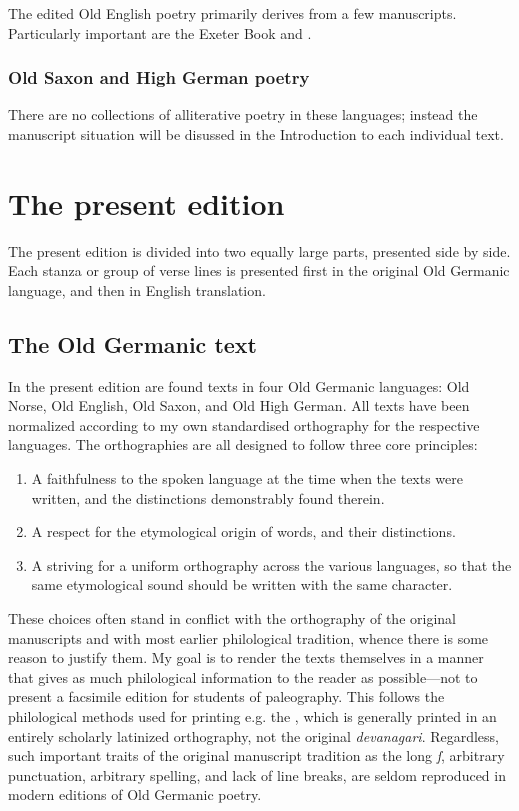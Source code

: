     The edited Old English poetry primarily derives from a few manuscripts.  Particularly important are the Exeter Book and \Lacnunga.

    \subsubsection{Old Saxon and High German poetry}

    There are no collections of alliterative poetry in these languages; instead the manuscript situation will be disussed in the Introduction to each individual text.


\section{The present edition}

  The present edition is divided into two equally large parts, presented side by side.  Each stanza or group of verse lines is presented first in the original Old Germanic language, and then in English translation.

  \subsection{The Old Germanic text}

    In the present edition are found texts in four Old Germanic languages: Old Norse, Old English, Old Saxon, and Old High German.  All texts have been normalized according to my own standardised orthography for the respective languages. The orthographies are all designed to follow three core principles:

    \begin{enumerate}
      \item A faithfulness to the spoken language at the time when the texts were written, and the distinctions demonstrably found therein.
      \item A respect for the etymological origin of words, and their distinctions.
      \item A striving for a uniform orthography across the various languages, so that the same etymological sound should be written with the same character.
    \end{enumerate}

    These choices often stand in conflict with the orthography of the original manuscripts and with most earlier philological tradition, whence there is some reason to justify them.  My goal is to render the texts themselves in a manner that gives as much philological information to the reader as possible—not to present a facsimile edition for students of paleography.  This follows the philological methods used for printing e.g. the \Rigveda, which is generally printed in an entirely scholarly latinized orthography, not the original \emph{devanagari}.  Regardless, such important traits of the original manuscript tradition as the long \emph{ſ}, arbitrary punctuation, arbitrary spelling, and lack of line breaks, are seldom reproduced in modern editions of Old Germanic poetry.

